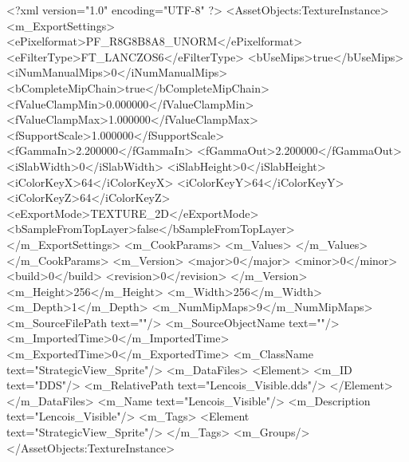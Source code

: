 <?xml version="1.0" encoding="UTF-8" ?>
<AssetObjects:TextureInstance>
    <m_ExportSettings>
        <ePixelformat>PF_R8G8B8A8_UNORM</ePixelformat>
        <eFilterType>FT_LANCZOS6</eFilterType>
        <bUseMips>true</bUseMips>
        <iNumManualMips>0</iNumManualMips>
        <bCompleteMipChain>true</bCompleteMipChain>
        <fValueClampMin>0.000000</fValueClampMin>
        <fValueClampMax>1.000000</fValueClampMax>
        <fSupportScale>1.000000</fSupportScale>
        <fGammaIn>2.200000</fGammaIn>
        <fGammaOut>2.200000</fGammaOut>
        <iSlabWidth>0</iSlabWidth>
        <iSlabHeight>0</iSlabHeight>
        <iColorKeyX>64</iColorKeyX>
        <iColorKeyY>64</iColorKeyY>
        <iColorKeyZ>64</iColorKeyZ>
        <eExportMode>TEXTURE_2D</eExportMode>
        <bSampleFromTopLayer>false</bSampleFromTopLayer>
    </m_ExportSettings>
    <m_CookParams>
        <m_Values>
        </m_Values>
    </m_CookParams>
    <m_Version>
        <major>0</major>
        <minor>0</minor>
        <build>0</build>
        <revision>0</revision>
    </m_Version>
    <m_Height>256</m_Height>
    <m_Width>256</m_Width>
    <m_Depth>1</m_Depth>
    <m_NumMipMaps>9</m_NumMipMaps>
    <m_SourceFilePath text=""/>
    <m_SourceObjectName text=""/>
    <m_ImportedTime>0</m_ImportedTime>
    <m_ExportedTime>0</m_ExportedTime>
    <m_ClassName text="StrategicView_Sprite"/>
    <m_DataFiles>
        <Element>
            <m_ID text="DDS"/>
            <m_RelativePath text="Lencois_Visible.dds"/>
        </Element>
    </m_DataFiles>
    <m_Name text="Lencois_Visible"/>
    <m_Description text="Lencois_Visible"/>
    <m_Tags>
        <Element text="StrategicView_Sprite"/>
    </m_Tags>
    <m_Groups/>
</AssetObjects:TextureInstance>
